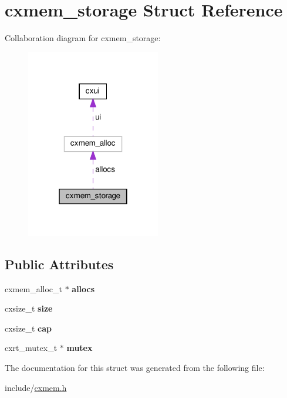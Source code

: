 \hypertarget{structcxmem__storage}{}\section{cxmem\+\_\+storage Struct Reference}
\label{structcxmem__storage}


Collaboration diagram for cxmem\+\_\+storage\+:
\nopagebreak
\begin{figure}[H]
\begin{center}
\leavevmode
\includegraphics[width=166pt]{structcxmem__storage__coll__graph}
\end{center}
\end{figure}
\subsection*{Public Attributes}
\begin{DoxyCompactItemize}
\item 
\mbox{\label{structcxmem__storage_a4663e63ea74aef2a831c26f29cec7147}} 
cxmem\+\_\+alloc\+\_\+t $\ast$ {\bfseries allocs}
\item 
\mbox{\label{structcxmem__storage_ae0e190eb4581da409bcf0c1709852e9f}} 
cxsize\+\_\+t {\bfseries size}
\item 
\mbox{\label{structcxmem__storage_a631394e8755be3e93cd90beeeb51ff3c}} 
cxsize\+\_\+t {\bfseries cap}
\item 
\mbox{\label{structcxmem__storage_a9c77308d0cf6fc2016ebaaafc77e0402}} 
cxrt\+\_\+mutex\+\_\+t $\ast$ {\bfseries mutex}
\end{DoxyCompactItemize}


The documentation for this struct was generated from the following file\+:\begin{DoxyCompactItemize}
\item 
include/\hyperlink{cxmem_8h}{cxmem.\+h}\end{DoxyCompactItemize}
